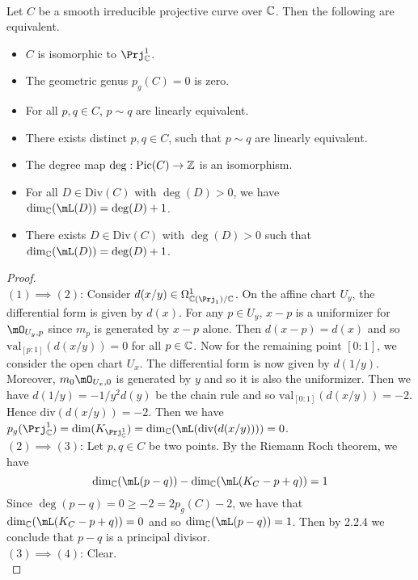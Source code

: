 \documentclass[a4paper]{article}
\begin{document}
\begin{prp}{}{}\\
Let $C$ be a smooth irreducible projective curve over $\mathbb{C}$. Then the following are equivalent. 
\begin{itemize}
\item $C$ is isomorphic to $\Prj_\C^1$. 
\item The geometric genus $p_g(C)=0$ is zero. 
\item For all $p,q\in C$, $p\sim q$ are linearly equivalent. 
\item There exists distinct $p,q\in C$, such that $p\sim q$ are linearly equivalent. 
\item The degree map $\deg:\text{Pic}(C)\to\mathbb{Z}$ is an isomorphism. 
\item For all $D\in\text{Div}(C)$ with $\deg(D)>0$, we have $\dim_\C(\mL(D))=\deg(D)+1$. 
\item There exists $D\in\text{Div}(C)$ with $\deg(D)>0$ such that $\dim_\C(\mL(D))=\deg(D)+1$. 
\end{itemize}
\begin{proof}\\
$(1)\implies(2)$: Consider $d(x/y)\in\Omega_{\C(\Prj_1)/\C}^1$. On the affine chart $U_y$, the differential form is given by $d(x)$. For any $p\in U_y$, $x-p$ is a uniformizer for $\mO_{U_y,p}$ since $m_p$ is generated by $x-p$ alone. Then $d(x-p)=d(x)$ and so $\text{val}_{[p:1]}(d(x/y))=0$ for all $p\in\mathbb{C}$. Now for the remaining point $[0:1]$, we consider the open chart $U_x$. The differential form is now given by $d(1/y)$. Moreover, $m_0\mO_{U_x,0}$ is generated by $y$ and so it is also the uniformizer. Then we have $d(1/y)=-1/y^2d(y)$ be the chain rule and so $\text{val}_{[0:1]}(d(x/y))=-2$. Hence $\text{div}(d(x/y))=-2$. Then we have $p_g(\Prj_\C^1)=\dim(K_{\Prj_\C^1})=\dim_\C(\mL(\text{div}(d(x/y))))=0$. \\

$(2)\implies(3)$: Let $p,q\in C$ be two points. By the Riemann Roch theorem, we have $$\dim_\C(\mL(p-q))-\dim_\C(\mL(K_C-p+q))=1$$ Since $\deg(p-q)=0\geq -2=2p_g(C)-2$, we have that $\dim_\C(\mL(K_C-p+q))=0$ and so $\dim_\C(\mL(p-q))=1$. Then by 2.2.4 we conclude that $p-q$ is a principal divisor. \\

$(3)\implies(4)$: Clear. \\


\end{proof}
\end{prp}
\end{document}
